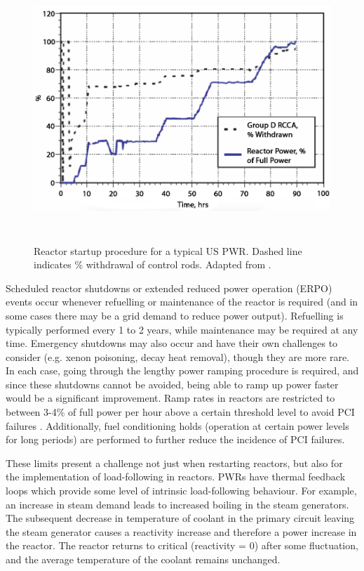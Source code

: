 \begin{figure}[ht]
\centering
\includegraphics[height=10cm]{images/reactor_startup.png}
\caption[Reactor startup procedure for a typical US PWR. Dashed line indicates \% withdrawal of control rods.]{Reactor startup procedure for a typical US PWR. Dashed line indicates \% withdrawal of control rods. Adapted from \cite{ramping}.}
\label{figure:reactor_startup}
\end{figure}

Scheduled reactor shutdowns or extended reduced power operation (ERPO) events occur whenever refuelling or maintenance of the reactor is required (and in some cases there may be a grid demand to reduce power output).  Refuelling is typically performed every 1 to 2 years, while maintenance may be required at any time. Emergency shutdowns may also occur and have their own challenges to consider (e.g. xenon poisoning, decay heat removal), though they are more rare. In each case, going through the lengthy power ramping procedure is required, and since these shutdowns cannot be avoided, being able to ramp up power faster would be a significant improvement. Ramp rates in reactors are restricted to between 3-4\% of full power per hour above a certain threshold level to avoid PCI failures \cite{ramping}. Additionally, fuel conditioning holds (operation at certain power levels for long periods) are performed to further reduce the incidence of PCI failures. 

These limits present a challenge not just when restarting reactors, but also for the implementation of load-following in reactors. PWRs have thermal feedback loops which provide some level of intrinsic load-following behaviour. For example, an increase in steam demand leads to increased boiling in the steam generators. The subsequent decrease in temperature of coolant in the primary circuit leaving the steam generator causes a reactivity increase and therefore a power increase in the reactor. The reactor returns to critical (reactivity = 0) after some fluctuation, and the average temperature of the coolant remains unchanged.

